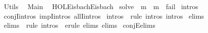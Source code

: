 %
\begin{isabellebody}%
%
%
\isadelimtheory
%
\endisadelimtheory
%
\isatagtheory
{}\isamarkupfalse%
\ Utils\isanewline
{}\isanewline
\ \ Main\isanewline
\ \ {\isachardoublequoteopen}HOL{\isacharminus}{\kern0pt}Eisbach{\isachardot}{\kern0pt}Eisbach{\isachardoublequoteclose}\isanewline
{}%
\endisatagtheory
{\isafoldtheory}%
%
\isadelimtheory
\isanewline
%
\endisadelimtheory
\isanewline
{}\isamarkupfalse%
\ solve\ \ m\ {\isacharequal}{\kern0pt}\ {\isacharparenleft}{\kern0pt}m\ {\isacharsemicolon}{\kern0pt}\ fail{\isacharparenright}{\kern0pt}\isanewline
\isanewline
{}\isamarkupfalse%
\ intros\isanewline
{}\isamarkupfalse%
\ conjI{\isacharbrackleft}{\kern0pt}intros{\isacharbrackright}{\kern0pt}\ impI{\isacharbrackleft}{\kern0pt}intros{\isacharbrackright}{\kern0pt}\ allI{\isacharbrackleft}{\kern0pt}intros{\isacharbrackright}{\kern0pt}\isanewline
{}\isamarkupfalse%
\ intros\ {\isacharequal}{\kern0pt}\ {\isacharparenleft}{\kern0pt}rule\ intros{\isacharsemicolon}{\kern0pt}\ intros{\isacharquery}{\kern0pt}{\isacharparenright}{\kern0pt}\isanewline
\isanewline
{}\isamarkupfalse%
\ elims\isanewline
{}\isamarkupfalse%
\ elims\ {\isacharequal}{\kern0pt}\ {\isacharparenleft}{\kern0pt}{\isacharparenleft}{\kern0pt}rule\ intros\ {\isacharbar}{\kern0pt}\ erule\ elims{\isacharparenright}{\kern0pt}{\isacharsemicolon}{\kern0pt}\ elims{\isacharquery}{\kern0pt}{\isacharparenright}{\kern0pt}\isanewline
{}\isamarkupfalse%
\ conjE{\isacharbrackleft}{\kern0pt}elims{\isacharbrackright}{\kern0pt}\isanewline
%
\isadelimtheory
\isanewline
%
\endisadelimtheory
%
\isatagtheory
{}\isamarkupfalse%
%
\endisatagtheory
{\isafoldtheory}%
%
\isadelimtheory
%
\endisadelimtheory
%
\end{isabellebody}%
\endinput
